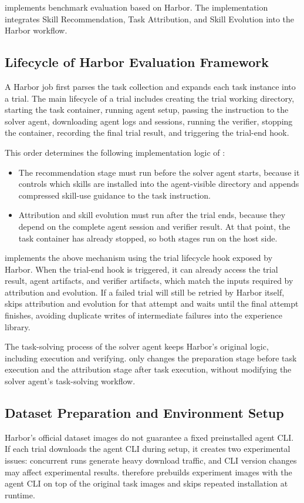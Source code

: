 \ours implements benchmark evaluation based on Harbor. The implementation integrates Skill Recommendation, Task Attribution, and Skill Evolution into the Harbor workflow.

\subsection{Lifecycle of Harbor Evaluation Framework}
A Harbor job first parses the task collection and expands each task instance into a trial. The main lifecycle of a trial includes creating the trial working directory, starting the task container, running agent setup, passing the instruction to the solver agent, downloading agent logs and sessions, running the verifier, stopping the container, recording the final trial result, and triggering the trial-end hook.

This order determines the following implementation logic of \ours:
\begin{itemize}
    \item The recommendation stage must run before the solver agent starts, because it controls which skills are installed into the agent-visible directory and appends compressed skill-use guidance to the task instruction.
    \item Attribution and skill evolution must run after the trial ends, because they depend on the complete agent session and verifier result. At that point, the task container has already stopped, so both stages run on the host side.
\end{itemize}

\ours implements the above mechanism using the trial lifecycle hook exposed by Harbor. When the trial-end hook is triggered, it can already access the trial result, agent artifacts, and verifier artifacts, which match the inputs required by attribution and evolution. If a failed trial will still be retried by Harbor itself, \ours skips attribution and evolution for that attempt and waits until the final attempt finishes, avoiding duplicate writes of intermediate failures into the experience library.

The task-solving process of the solver agent keeps Harbor's original logic, including execution and verifying. \ours only changes the preparation stage before task execution and the attribution stage after task execution, without modifying the solver agent's task-solving workflow.

\subsection{Dataset Preparation and Environment Setup}
Harbor's official dataset images do not guarantee a fixed preinstalled agent CLI. If each trial downloads the agent CLI during setup, it creates two experimental issues: concurrent runs generate heavy download traffic, and CLI version changes may affect experimental results. \ours therefore prebuilds experiment images with the agent CLI on top of the original task images and skips repeated installation at runtime.

